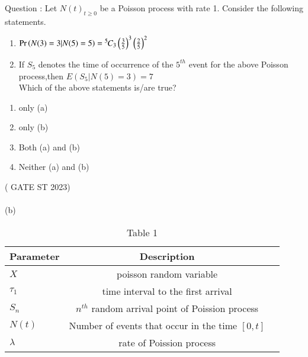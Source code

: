 \documentclass[journal,12pt,onecolumn]{IEEEtran}
\theoremstyle{remark}
\begin{document}
\let\vec\mathbf




\vspace{3cm}



\bigskip

\renewcommand{\thefigure}{\theenumi}
\renewcommand{\thetable}{\theenumi}
Question : Let ${N(t)}_{t\ge 0}$ be a Poisson process with rate 1. Consider the following statements. 
\begin{enumerate}[label=(\alph*)]
\item $\Pr\left(N(3)=3|N(5)=5\right)={{}^{5}\mkern-1muC_{3}}\left(\frac{3}{5}\right)^3 \left(\frac{2}{5}\right)^2$
\item If $S_5$ denotes the time of occurrence of the $5^{th}$ event for the above Poisson process,then $E(S_5|N(5)=3)=7$ \\
Which of the above statements is/are true?\\
\end{enumerate}
\begin{enumerate}[label=(\roman*)]
\item only (a)
\item only (b)
\item Both (a) and (b)
\item Neither (a) and (b)
\end{enumerate}
\hfill ( GATE ST 2023)\\
\solution \\
(b)
 \begin{table}[h!]
 \begin{center}
    \begin{tabular}{|l|c|r|}
    \hline
    Parameter & Description\\
    \hline
    $X$ & poisson random variable \\
    $\tau_1$ &  time interval to the first arrival\\
    $S_n$ &  $n^{th}$ random arrival point of Poission process \\
    $N(t)$ & Number of events that occur in the time $[0,t]$\\
    $\lambda$ & rate of Poission process\\
    \hline
    \end{tabular}
    \end{center}
    \caption{Table 1}
\end{table}
\end{document}
